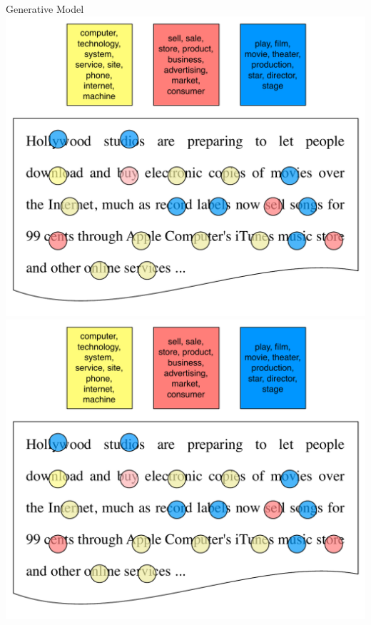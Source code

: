 \begin{frame}{Generative Model}
	\only<6> {   \includegraphics[width=.8\linewidth]{topic_models/inference_3}  }
	\only<7> {   \includegraphics[width=.6\linewidth]{topic_models/inference_3}  }


\end{frame}

